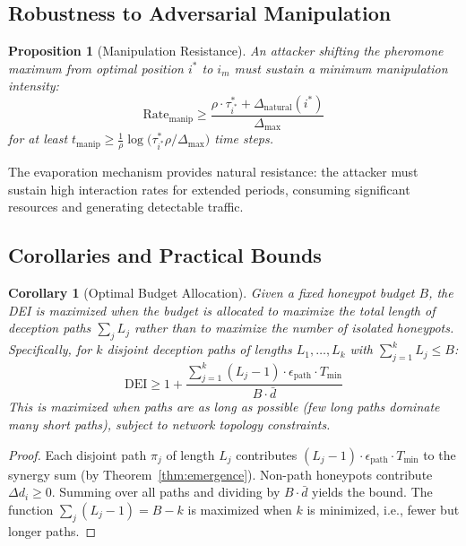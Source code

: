 \documentclass[review,3p,twocolumn]{elsarticle}
\newtheorem{proposition}[theorem]{Proposition}
\newtheorem{corollary}[theorem]{Corollary}
\newcommand{\DEI}{\mathrm{DEI}}
\begin{document}
\subsection{Robustness to Adversarial Manipulation}

\begin{proposition}[Manipulation Resistance]
\label{prop:robust}
An attacker shifting the pheromone maximum from optimal position $i^*$ to $i_m$ must sustain a minimum manipulation intensity:
\begin{equation}
\mathrm{Rate}_{\mathrm{manip}} \geq \frac{\rho \cdot \tau_{i^*}^* + \Delta_{\mathrm{natural}}(i^*)}{\Delta_{\max}}
\end{equation}
for at least $t_{\mathrm{manip}} \geq \frac{1}{\rho} \log\!\bigl(\tau_{i^*}^* \rho / \Delta_{\max}\bigr)$ time steps.
\end{proposition}

The evaporation mechanism provides natural resistance: the attacker must sustain high interaction rates for extended periods, consuming significant resources and generating detectable traffic.

\subsection{Corollaries and Practical Bounds}

\begin{corollary}[Optimal Budget Allocation]
\label{cor:budget}
Given a fixed honeypot budget $B$, the DEI is maximized when the budget is allocated to maximize the total length of deception paths $\sum_j L_j$ rather than to maximize the number of isolated honeypots. Specifically, for $k$ disjoint deception paths of lengths $L_1, \ldots, L_k$ with $\sum_{j=1}^{k} L_j \leq B$:
\begin{equation}
\DEI \geq 1 + \frac{\sum_{j=1}^{k}(L_j - 1) \cdot \epsilon_{\mathrm{path}} \cdot T_{\min}}{B \cdot \bar{d}}
\end{equation}
This is maximized when paths are as long as possible (few long paths dominate many short paths), subject to network topology constraints.
\end{corollary}

\begin{proof}
Each disjoint path $\pi_j$ of length $L_j$ contributes $(L_j - 1) \cdot \epsilon_{\mathrm{path}} \cdot T_{\min}$ to the synergy sum (by Theorem~\ref{thm:emergence}). Non-path honeypots contribute $\Delta d_i \geq 0$. Summing over all paths and dividing by $B \cdot \bar{d}$ yields the bound. The function $\sum_j (L_j - 1) = B - k$ is maximized when $k$ is minimized, i.e., fewer but longer paths.
\end{proof}
\end{document}
